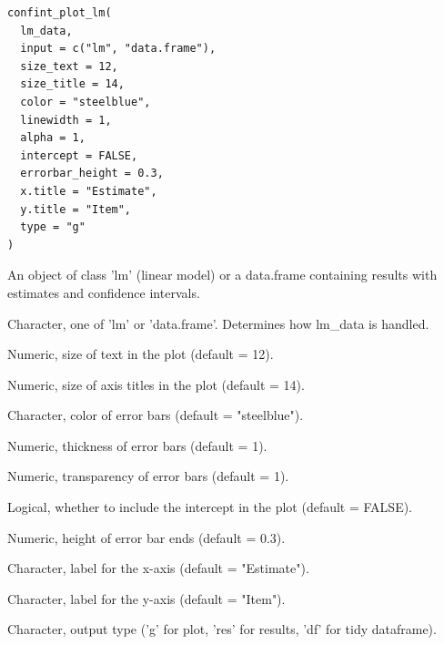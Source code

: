\documentclass[a4paper]{book}
\begin{document}
%
\begin{Usage}
\begin{verbatim}
confint_plot_lm(
  lm_data,
  input = c("lm", "data.frame"),
  size_text = 12,
  size_title = 14,
  color = "steelblue",
  linewidth = 1,
  alpha = 1,
  intercept = FALSE,
  errorbar_height = 0.3,
  x.title = "Estimate",
  y.title = "Item",
  type = "g"
)
\end{verbatim}
\end{Usage}
%
\begin{Arguments}
\begin{ldescription}
\item[\code{lm\_data}] An object of class 'lm' (linear model) or a data.frame containing results with estimates and confidence intervals.

\item[\code{input}] Character, one of 'lm' or 'data.frame'. Determines how lm\_data is handled.

\item[\code{size\_text}] Numeric, size of text in the plot (default = 12).

\item[\code{size\_title}] Numeric, size of axis titles in the plot (default = 14).

\item[\code{color}] Character, color of error bars (default = "steelblue").

\item[\code{linewidth}] Numeric, thickness of error bars (default = 1).

\item[\code{alpha}] Numeric, transparency of error bars (default = 1).

\item[\code{intercept}] Logical, whether to include the intercept in the plot (default = FALSE).

\item[\code{errorbar\_height}] Numeric, height of error bar ends (default = 0.3).

\item[\code{x.title}] Character, label for the x-axis (default = "Estimate").

\item[\code{y.title}] Character, label for the y-axis (default = "Item").

\item[\code{type}] Character, output type ('g' for plot, 'res' for results, 'df' for tidy dataframe).
\end{ldescription}
\end{Arguments}
\end{document}
